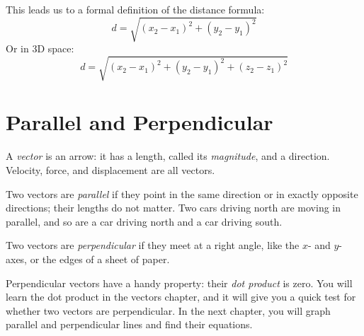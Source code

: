 This leads us to a formal definition of the distance formula:
\[
d = \sqrt{(x_2 - x_1)^2 + (y_2 - y_1)^2}
\]
Or in 3D space:
\[
d = \sqrt{(x_2 - x_1)^2 + (y_2 - y_1)^2 + (z_2 - z_1)^2}
\]


\section{Parallel and Perpendicular}
A \emph{vector} is an arrow: it has a length, called its \emph{magnitude}, and a direction. Velocity, force, and displacement are all vectors.

Two vectors are \emph{parallel} if they point in the same direction or in exactly opposite directions; their lengths do not matter. Two cars driving north are moving in parallel, and so are a car driving north and a car driving south.

\begin{center}
\end{center}

Two vectors are \emph{perpendicular} if they meet at a right angle, like the $x$- and $y$-axes, or the edges of a sheet of paper.

\begin{center}
\end{center}

Perpendicular vectors have a handy property: their \emph{dot product} is zero. You will learn the dot product in the vectors chapter, and it will give you a quick test for whether two vectors are perpendicular. In the next chapter, you will graph parallel and perpendicular lines and find their equations.

